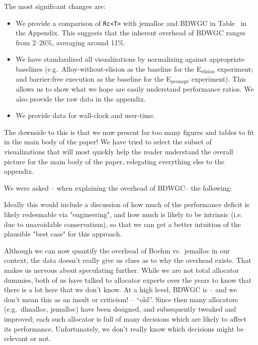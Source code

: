 \documentclass[12pt,a4paper,preprint]{article}
\newcommand\Eelision{E$_\textrm{elision}$\xspace}
\newcommand\Epremopt{E$_\textrm{premopt}$\xspace}
\newcommand\boehm{\textsc{BDWGC}\xspace}
\begin{document}
The most significant changes are:

\begin{itemize}
  \item We provide a comparison of \lstinline{Rc<T>} with jemalloc and \boehm
    in Table~ in the Appendix. This suggests that the inherent
    overhead of \boehm ranges from 2--26\%, averaging around 11\%.

  \item We have standardized all visualizations by normalizing against
    appropriate baselines (e.g.~Alloy-without-elision as the baseline for
    the \Eelision experiment; and barrier-free execution as the baseline
    for the \Epremopt experiment). This allows us to show what we hope
    are easily understand performance ratios. We also provide the raw data
    in the appendix.

  \item We provide data for wall-clock and user-time.
\end{itemize}

The downside to this is that we now present far too many figures and tables to
fit in the main body of the paper! We have tried to select the subset of
visualizations that will most quickly help the reader understand the overall
picture for the main body of the paper, relegating everything else to the
appendix.

We were asked -- when explaining the overhead of \boehm -- the following:

\begin{blockquote}
Ideally this would include a
discussion of how much of the performance deficit is likely redeemable via
"engineering", and how much is likely to be intrinsic (i.e. due to
unavoidable conservatism), so that we can get a better intuition of the
plausible "best case" for this approach.
\end{blockquote}

Although we can now quantify the overhead of Boehm vs.~jemalloc in our context,
the data doesn't really give us clues as to why the overhead exists. That makes
us nervous about speculating further. While we are not total allocator dummies,
both of us have talked to allocator experts over the years to know that there is a lot
here that we don't know. At a high level, \boehm is -- and we don't mean this as an
insult or criticism! -- ``old''. Since then many allocators (e.g.~dlmalloc, jemalloc)
have been designed, and subsequently tweaked and improved; each such allocator
is full of many decisions which are likely to affect its performance. Unfortunately,
we don't really know which decisions might be relevant or not.
\end{document}
